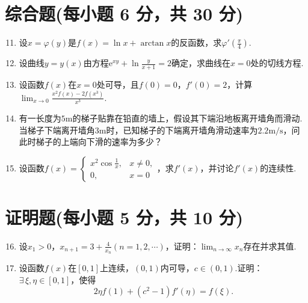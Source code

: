 \documentclass[../Main.tex]{subfiles}
\begin{document}
\section{综合题(每小题 6 分，共 30 分)}
\begin{enumerate}
    \setcounter{enumi}{10}
    \item 设$x=\varphi(y)$是$f(x)=\ln x+\arctan x$的反函数，求$\varphi'\left
              (\frac{\pi}{4}\right)$.
          \vspace{10em}

    \item 设曲线$y=y(x)$由方程$\mathrm{e}^{xy}+\ln\frac{y}{x+1}=2$确定，求曲线在$x
              =0$处的切线方程.
          \vspace{10em}

    \item 设函数$f(x)$在$x=0$处可导，且$f(0)=0$，$f'(0)=2$，计算$\lim_{x\to0}
              \frac{x^{2}f(x)-2f(x^{3})}{x^{3}}$.
          \vspace{10em}

    \item 有一长度为$5\mathrm{m}$的梯子贴靠在铅直的墙上，假设其下端沿地板离开墙角而滑动.当梯子下端离开墙角$3
              \mathrm{m}$时，已知梯子的下端离开墙角滑动速率为$2.2\mathrm{m/s}$，问此时梯子的上端向下滑的速率为多少？
          \vspace{10em}

    \item 设函数$f(x)=
              \begin{cases}
                  x^{2}\cos\frac{1}{x}, & x\neq0, \\
                  0,                    & x=0
              \end{cases}$，求$f'(x)$，并讨论$f'(x)$的连续性.
          \vspace{12em}
\end{enumerate}

\section{证明题(每小题 5 分，共 10 分)}
\begin{enumerate}
    \setcounter{enumi}{15}
    \item 设$x_{1}>0$，$x_{n+1}=3+\frac{4}{x_{n}}(n=1,2,\cdots)$，证明：$\lim
              _{n\to\infty}x_{n}$存在并求其值.
          \vspace{12em}

    \item 设函数$f(x)$在$[0,1]$上连续，$(0,1)$内可导，$c\in(0,1)$.证明：$\exists
              \,\xi,\eta\in[0,1]$，使得
          \[
              2\eta f(1)+(c^{2}-1)f'(\eta)=f(\xi).
          \]
          \vspace{10em}
\end{enumerate}
\end{document}
